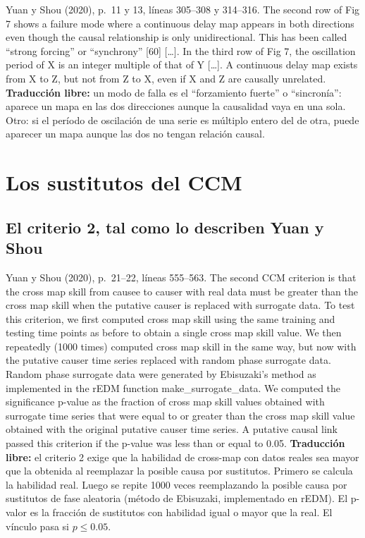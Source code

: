 \documentclass[11pt,openany]{book}
\begin{document}
\begin{cita}{Yuan y Shou (2020), p.~11 y 13, líneas 305--308 y 314--316.}
The second row of Fig 7 shows a failure mode where a continuous delay map appears in both directions even though the causal relationship is only unidirectional. This has been called “strong forcing” or “synchrony” [60] [\dots]. In the third row of Fig 7, the oscillation period of X is an integer multiple of that of Y [\dots]. A continuous delay map exists from X to Z, but not from Z to X, even if X and Z are causally unrelated.
\tcblower
\textbf{Traducción libre:} un modo de falla es el ``forzamiento fuerte'' o ``sincronía'': aparece un mapa en las dos direcciones aunque la causalidad vaya en una sola. Otro: si el período de oscilación de una serie es múltiplo entero del de otra, puede aparecer un mapa aunque las dos no tengan relación causal.
\end{cita}

\chapter{Los sustitutos del CCM}\label{cap:sust-ccm}

\section{El criterio 2, tal como lo describen Yuan y Shou}

\begin{cita}{Yuan y Shou (2020), p.~21--22, líneas 555--563.}
The second CCM criterion is that the cross map skill from causee to causer with real data must be greater than the cross map skill when the putative causer is replaced with surrogate data. To test this criterion, we first computed cross map skill using the same training and testing time points as before to obtain a single cross map skill value. We then repeatedly (1000 times) computed cross map skill in the same way, but now with the putative causer time series replaced with random phase surrogate data. Random phase surrogate data were generated by Ebisuzaki’s method as implemented in the rEDM function make\_surrogate\_data. We computed the significance p-value as the fraction of cross map skill values obtained with surrogate time series that were equal to or greater than the cross map skill value obtained with the original putative causer time series. A putative causal link passed this criterion if the p-value was less than or equal to 0.05.
\tcblower
\textbf{Traducción libre:} el criterio 2 exige que la habilidad de cross-map con datos reales sea mayor que la obtenida al reemplazar la posible causa por sustitutos. Primero se calcula la habilidad real. Luego se repite 1000 veces reemplazando la posible causa por sustitutos de fase aleatoria (método de Ebisuzaki, implementado en rEDM). El p-valor es la fracción de sustitutos con habilidad igual o mayor que la real. El vínculo pasa si $p \le 0.05$.
\end{cita}
\end{document}
